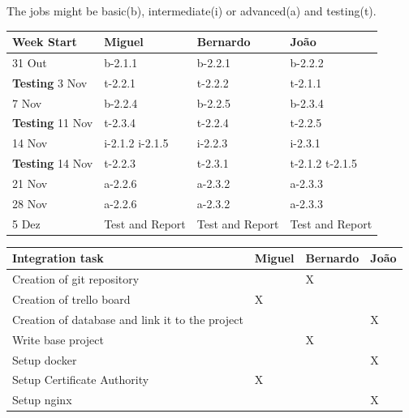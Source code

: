 \documentclass[a4paper,titlepage,11pt]{article}
\begin{document}
The jobs might be basic(b), intermediate(i) or advanced(a) and testing(t).
\begin{center}
    \begin{tabular}{| l || l | l | l |}
    \hline
    \textbf{Week Start} & \textbf{Miguel} & \textbf{Bernardo} & \textbf{João} \\ \hline \hline
    31 Out & b-2.1.1 & b-2.2.1 & b-2.2.2 \\
    \textbf{Testing} 3 Nov& t-2.2.1 & t-2.2.2 & t-2.1.1 \\ \hline
    7 Nov & b-2.2.4 & b-2.2.5 & b-2.3.4 \\
    \textbf{Testing} 11 Nov & t-2.3.4 & t-2.2.4 & t-2.2.5 \\ \hline
    14 Nov & i-2.1.2 i-2.1.5 & i-2.2.3 & i-2.3.1 \\
    \textbf{Testing} 14 Nov & t-2.2.3 & t-2.3.1 & t-2.1.2 t-2.1.5 \\ \hline
    21 Nov & a-2.2.6 & a-2.3.2 & a-2.3.3 \\
    28 Nov & a-2.2.6 & a-2.3.2 & a-2.3.3 \\
    5 Dez & Test and Report & Test and Report & Test and Report \\ \hline

    \end{tabular}
\end{center}

\begin{center}
    \begin{tabular}{|l| l | l | l |}
    \hline
    \textbf{Integration task} & \textbf{Miguel} & \textbf{Bernardo} & \textbf{João} \\ \hline \hline
    Creation of git repository &  & X &  \\ \hline
    Creation of trello board & X &  &  \\ \hline
    Creation of database and link it to the project &  &  & X \\ \hline
    Write base project &  & X &  \\ \hline
    Setup docker & & & X\\ \hline
    Setup Certificate Authority & X & & \\ \hline
    Setup nginx & & & X \\ \hline

    \end{tabular}
\end{center}

\newpage
\end{document}
